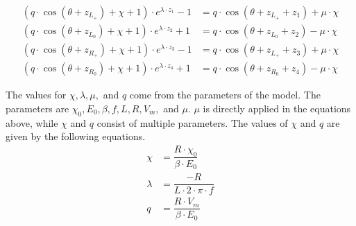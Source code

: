 \begin{subequations}
\begin{align}
    (q \cdot \cos(\theta + z_{L_+}) + \chi + 1) \cdot e^{\lambda \cdot z_1} - 1
    & = q \cdot  \cos(\theta + z_{L_+} + z_1) + \mu \cdot \chi \\
    (q \cdot \cos(\theta + z_{L_0}) + \chi + 1) \cdot e^{\lambda \cdot z_2} + 1
    & = q \cdot  \cos(\theta + z_{L_0} + z_2) - \mu \cdot \chi \\
    (q \cdot \cos(\theta + z_{R_+}) + \chi + 1) \cdot e^{\lambda \cdot z_3} - 1
    & = q \cdot  \cos(\theta + z_{L_+} + z_3) + \mu \cdot \chi \\
    (q \cdot \cos(\theta + z_{R_0}) + \chi + 1) \cdot e^{\lambda \cdot z_4} + 1
    & = q \cdot  \cos(\theta + z_{R_0} + z_4) - \mu \cdot \chi
\end{align}
\end{subequations}


The values for $\chi, \lambda, \mu,$ and $q$ come from the parameters of the model.
The parameters are $\chi_0, E_0, \beta, f, L, R, V_m,$ and $\mu$.
$\mu$ is directly applied in the equations above, while $\chi$ and $q$ consist of multiple parameters.
The values of $\chi$ and $q$ are given by the following equations.
\begin{align}
    \chi & = \dfrac{R \cdot \chi_0}{\beta \cdot E_0} \\
    \lambda & = \dfrac{-R}{L \cdot 2 \cdot \pi \cdot f} \\
    q & = \dfrac{R \cdot V_m}{\beta \cdot E_0}
\end{align}
